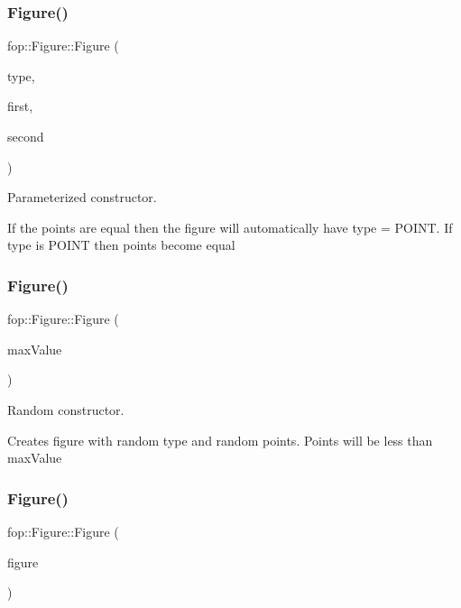\subsubsection{\texorpdfstring{Figure()}{Figure()}\hspace{0.1cm}{\footnotesize\ttfamily [2/4]}}
{\footnotesize\ttfamily fop\+::\+Figure\+::\+Figure (\begin{DoxyParamCaption}\item[{\mbox{\hyperlink{namespacefop_a60dafe2e1ac5bb402dad57ecacde23d5}{Figures\+Type}}}]{type,  }\item[{\mbox{\hyperlink{structtdp_1_1_point}{Point}}}]{first,  }\item[{\mbox{\hyperlink{structtdp_1_1_point}{Point}}}]{second }\end{DoxyParamCaption})}



Parameterized constructor. 

If the points are equal then the figure will automatically have \textquotesingle{}type\textquotesingle{} = P\+O\+I\+NT. If \textquotesingle{}type\textquotesingle{} is P\+O\+I\+NT then points become equal \mbox{\label{classfop_1_1_figure_a2e24606aff7c6e923d3b1db4cb7f39df}} 
\subsubsection{\texorpdfstring{Figure()}{Figure()}\hspace{0.1cm}{\footnotesize\ttfamily [3/4]}}
{\footnotesize\ttfamily fop\+::\+Figure\+::\+Figure (\begin{DoxyParamCaption}\item[{\mbox{\hyperlink{structtdp_1_1_point}{Point}}}]{max\+Value }\end{DoxyParamCaption})}



Random constructor. 

Creates figure with random \textquotesingle{}type\textquotesingle{} and random points. Points will be less than \textquotesingle{}max\+Value\textquotesingle{} \mbox{\label{classfop_1_1_figure_a2cc70342facf7064e5724651e351046b}} 
\subsubsection{\texorpdfstring{Figure()}{Figure()}\hspace{0.1cm}{\footnotesize\ttfamily [4/4]}}
{\footnotesize\ttfamily fop\+::\+Figure\+::\+Figure (\begin{DoxyParamCaption}\item[{const \mbox{\hyperlink{classfop_1_1_figure}{Figure}} \&}]{figure }\end{DoxyParamCaption})}



